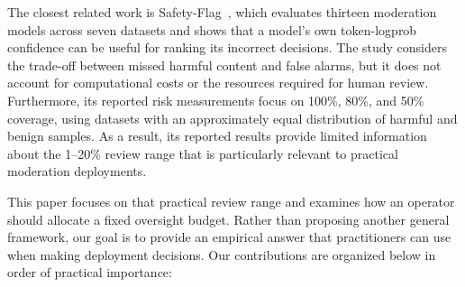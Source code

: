 \documentclass[11pt]{article}
\begin{document}
The closest related work is Safety-Flag~\cite{hu2026safetyflag}, which evaluates thirteen moderation models across seven datasets and shows that a model's own token-logprob confidence can be useful for ranking its incorrect decisions. The study considers the trade-off between missed harmful content and false alarms, but it does not account for computational costs or the resources required for human review. Furthermore, its reported risk measurements focus on 100\%, 80\%, and 50\% coverage, using datasets with an approximately equal distribution of harmful and benign samples. As a result, its reported results provide limited information about the 1--20\% review range that is particularly relevant to practical moderation deployments.

This paper focuses on that practical review range and examines how an operator should allocate a fixed oversight budget. Rather than proposing another general framework, our goal is to provide an empirical answer that practitioners can use when making deployment decisions. Our contributions are organized below in order of practical importance:
\end{document}
